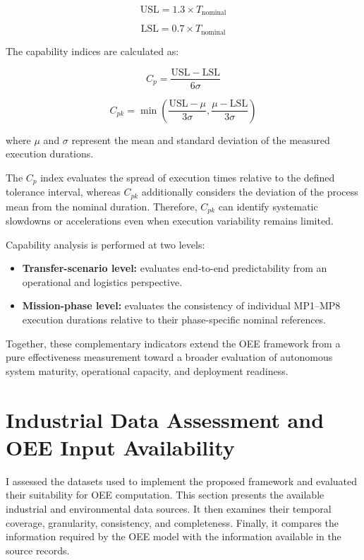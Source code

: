 \[
\mathrm{USL} = 1.3 \times T_{\mathrm{nominal}}
\]

\[
\mathrm{LSL} = 0.7 \times T_{\mathrm{nominal}}
\]

The capability indices are calculated as:

\[
C_p = \frac{\mathrm{USL} - \mathrm{LSL}}{6\sigma}
\]

\[
C_{pk} = \min\left(\frac{\mathrm{USL} - \mu}{3\sigma}, \frac{\mu - \mathrm{LSL}}{3\sigma}\right)
\]

where $\mu$ and $\sigma$ represent the mean and standard deviation of the measured execution durations.

The $C_p$ index evaluates the spread of execution times relative to the defined tolerance interval, whereas $C_{pk}$ additionally considers the deviation of the process mean from the nominal duration. Therefore, $C_{pk}$ can identify systematic slowdowns or accelerations even when execution variability remains limited.

Capability analysis is performed at two levels:

\begin{itemize}
  \item \textbf{Transfer-scenario level:} evaluates end-to-end predictability from an operational and logistics perspective.
  \item \textbf{Mission-phase level:} evaluates the consistency of individual MP1–MP8 execution durations relative to their phase-specific nominal references.
\end{itemize}

Together, these complementary indicators extend the OEE framework from a pure effectiveness measurement toward a broader evaluation of autonomous system maturity, operational capacity, and deployment readiness.


\section{Industrial Data Assessment and OEE Input Availability}
\label{sec:industrial-data-sources-oee-input-availability}
I assessed the datasets used to implement the proposed framework and evaluated their suitability for OEE computation. This section presents the available industrial and environmental data sources. It then examines their temporal coverage, granularity, consistency, and completeness. Finally, it compares the information required by the OEE model with the information available in the source records.

